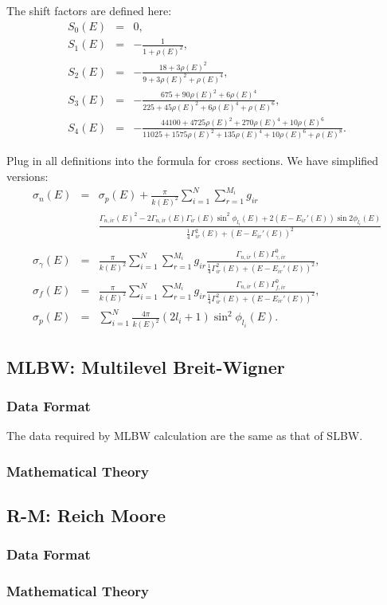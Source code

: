 The shift factors are defined here:
\begin{eqnarray}
S_0(E) &=& 0,\\
S_1(E) &=& -\frac{1}{1+\rho(E)^2},\\
S_2(E) &=& -\frac{18+3\rho(E)^2}{9+3\rho(E)^2+\rho(E)^4},\\
S_3(E) &=& -\frac{675+90\rho(E)^2+6\rho(E)^4}{225+45\rho(E)^2+6\rho(E)^4+\rho(E)^6},\\
S_4(E) &=& -\frac{44100+4725\rho(E)^2+270\rho(E)^4+10\rho(E)^6}{11025+1575\rho(E)^2+135\rho(E)^4+10\rho(E)^6+\rho(E)^8}.
\end{eqnarray}

Plug in all definitions into the formula for cross sections. We have simplified versions:
\begin{eqnarray}
\sigma_{n}(E)  &=& \sigma_p(E) + \frac{\pi}{k(E)^2}\sum_{i=1}^{N}\sum_{r=1}^{M_i}g_{ir}\nonumber\\
&& \frac{\Gamma_{n,ir}(E)^2-2\Gamma_{n,ir}(E)\Gamma_{ir}(E)\sin^2\phi_{l_i}(E)+2(E-E_{ir}'(E))\sin2\phi_{l_i}(E)}{\frac{1}{4}\Gamma_{ir}^2(E)+(E-E_{ir}'(E))^2}\nonumber\\
&&\\
\sigma_{\gamma}(E) &=& \frac{\pi}{k(E)^2}\sum_{i=1}^{N}\sum_{r=1}^{M_i}g_{ir}\frac{\Gamma_{n,ir}(E)\Gamma_{\gamma,ir}^0}{\frac{1}{4}\Gamma_{ir}^2(E)+(E-E_{ir}'(E))^2},\\
\sigma_{f}(E) &=& \frac{\pi}{k(E)^2}\sum_{i=1}^{N}\sum_{r=1}^{M_i}g_{ir}\frac{\Gamma_{n,ir}(E)\Gamma_{f,ir}^0}{\frac{1}{4}\Gamma_{ir}^2(E)+(E-E_{ir}'(E))^2},\\
\sigma_{p}(E) &=& \sum_{i=1}^{N} \frac{4\pi}{k(E)^2}(2l_i+1)\sin^2\phi_{l_i}(E).
\end{eqnarray}


\subsection{MLBW: Multilevel Breit-Wigner}

\subsubsection{Data Format}
The data required by MLBW calculation are the same as that of SLBW.


\subsubsection{Mathematical Theory}



\subsection{R-M: Reich Moore}

\subsubsection{Data Format}

\subsubsection{Mathematical Theory}





